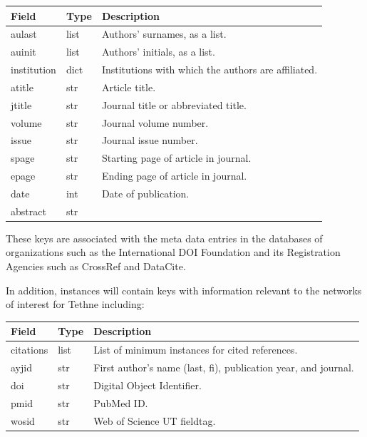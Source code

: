 \documentclass[letterpaper,10pt,english]{sphinxmanual}
\begin{document}
\begin{tabulary}{\linewidth}{|L|L|L|}
\hline
\textsf{\relax 
Field
} & \textsf{\relax 
Type
} & \textsf{\relax 
Description
}\\
\hline
aulast
 & 
list
 & 
Authors' surnames, as a list.
\\

auinit
 & 
list
 & 
Authors' initials, as a list.
\\

institution
 & 
dict
 & 
Institutions with which the authors are affiliated.
\\

atitle
 & 
str
 & 
Article title.
\\

jtitle
 & 
str
 & 
Journal title or abbreviated title.
\\

volume
 & 
str
 & 
Journal volume number.
\\

issue
 & 
str
 & 
Journal issue number.
\\

spage
 & 
str
 & 
Starting page of article in journal.
\\

epage
 & 
str
 & 
Ending page of article in journal.
\\

date
 & 
int
 & 
Date of publication.
\\

abstract
 & 
str
 & \\
\hline\end{tabulary}


These keys are associated with the meta data entries in the databases of
organizations such as the International DOI Foundation and its Registration
Agencies such as CrossRef and DataCite.

In addition, {\hyperref[tethne.classes.paper:tethne.classes.paper.Paper]{}} instances will contain keys with information
relevant to the networks of interest for Tethne including:

\begin{tabulary}{\linewidth}{|L|L|L|}
\hline
\textsf{\relax 
Field
} & \textsf{\relax 
Type
} & \textsf{\relax 
Description
}\\
\hline
citations
 & 
list
 & 
List of minimum {\hyperref[tethne.classes.paper:tethne.classes.paper.Paper]{}} instances for cited
references.
\\

ayjid
 & 
str
 & 
First author's name (last, fi), publication year, and
journal.
\\

doi
 & 
str
 & 
Digital Object Identifier.
\\

pmid
 & 
str
 & 
PubMed ID.
\\

wosid
 & 
str
 & 
Web of Science UT fieldtag.
\\
\hline\end{tabulary}
\end{document}
